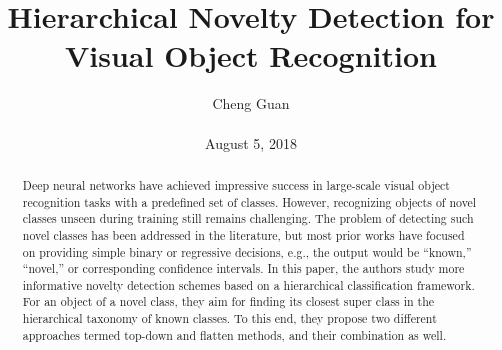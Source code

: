 \documentclass[10pt,twocolumn,letterpaper]{article}
\title{Hierarchical Novelty Detection for Visual Object Recognition}
\author{Cheng Guan\\\\
August 5, 2018}
\begin{document}
\maketitle
\begin{abstract}
Deep neural networks have achieved impressive success
in large-scale visual object recognition tasks with a predefined set of classes. However, recognizing objects of novel
classes unseen during training still remains challenging.
The problem of detecting such novel classes has been addressed in the literature, but most prior works have focused
on providing simple binary or regressive decisions, e.g., the
output would be ``known,'' ``novel,'' or corresponding confidence intervals. In this paper, the authors study more informative
novelty detection schemes based on a hierarchical classification framework. For an object of a novel class, they aim
for finding its closest super class in the hierarchical taxonomy of known classes. To this end, they propose two different
approaches termed top-down and flatten methods, and their
combination as well.
\end{abstract}
\end{document}
